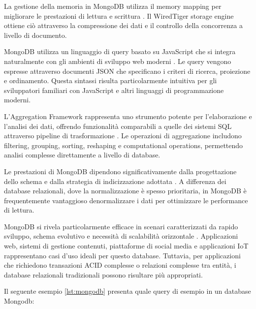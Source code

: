 La gestione della memoria in MongoDB utilizza il memory mapping per migliorare le prestazioni di lettura e scrittura \cite{dayley2014mongodb}. Il WiredTiger storage engine ottiene ciò attraverso la compressione dei dati e il controllo della concorrenza a livello di documento.

MongoDB utilizza un linguaggio di query basato su JavaScript che si integra naturalmente con gli ambienti di sviluppo web moderni \cite{harrison2015mongodb}. Le query vengono espresse attraverso documenti JSON che specificano i criteri di ricerca, proiezione e ordinamento. Questa sintassi risulta particolarmente intuitiva per gli sviluppatori familiari con JavaScript e altri linguaggi di programmazione moderni.

L'Aggregation Framework rappresenta uno strumento potente per l'elaborazione e l'analisi dei dati, offrendo funzionalità comparabili a quelle dei sistemi SQL attraverso pipeline di trasformazione \cite{membrey2014definitive}. Le operazioni di aggregazione includono filtering, grouping, sorting, reshaping e computational operations, permettendo analisi complesse direttamente a livello di database.

Le prestazioni di MongoDB dipendono significativamente dalla progettazione dello schema e dalla strategia di indicizzazione adottata \cite{chodorow2013mongodb}. A differenza dei database relazionali, dove la normalizzazione è spesso prioritaria, in MongoDB è frequentemente vantaggioso denormalizzare i dati per ottimizzare le performance di lettura.

MongoDB si rivela particolarmente efficace in scenari caratterizzati da rapido sviluppo, schema evolutivo e necessità di scalabilità orizzontale \cite{banker2011mongodb}. Applicazioni web, sistemi di gestione contenuti, piattaforme di social media e applicazioni IoT rappresentano casi d'uso ideali per questo database. Tuttavia, per applicazioni che richiedono transazioni ACID complesse o relazioni complesse tra entità, i database relazionali tradizionali possono risultare più appropriati.

Il seguente esempio \ref{lst:mongodb} presenta quale query di esempio in un database Mongodb:

